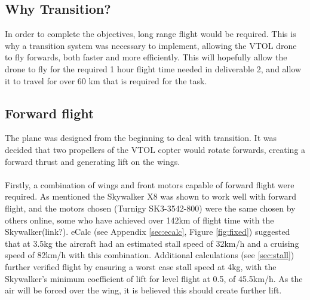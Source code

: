 \label{sec:transition}



\subsection{Why Transition?}
In order to complete the objectives, long range flight would be required. This is why a transition system was necessary to implement, allowing the VTOL drone to fly forwards, both faster and more efficiently. This will hopefully allow the drone to fly for the required 1 hour flight time needed in deliverable 2, and allow it to travel for over 60 km that is required for the task. 

\subsection{Forward flight}
The plane was designed from the beginning to deal with transition. It was decided that two propellers of the VTOL copter would rotate forwards, creating a forward thrust and generating lift on the wings.  
\\\\
Firstly, a combination of wings and front motors capable of forward flight were required.  As mentioned the Skywalker X8 was shown to work well with forward flight, and the motors chosen (Turnigy SK3-3542-800) were the same chosen by others online, some who have achieved over 142km of flight time with the Skywalker(link?). eCalc (see Appendix \ref{sec:ecalc}, Figure \ref{fig:fixed}) suggested that at 3.5kg the aircraft had an estimated stall speed of 32km/h and a cruising speed of 82km/h with this combination. Additional calculations (see \ref{sec:stall}) further verified flight by ensuring a worst case stall speed at 4kg, with the Skywalker's minimum coefficient of lift for level flight at 0.5, of 45.5km/h. As the air will be forced over the wing, it is believed this should create further lift.

